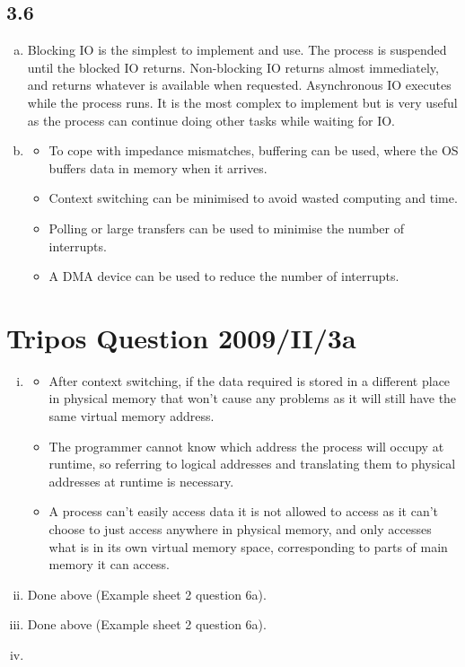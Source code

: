 \documentclass[12pt]{article}
\begin{document}
\subsection*{3.6}
\begin{enumerate}[(a)]
    \item Blocking IO is the simplest to implement and use. The process is suspended until the blocked IO returns. Non-blocking IO returns almost immediately, and returns whatever is available when requested. Asynchronous IO executes while the process runs. It is the most complex to implement but is very useful as the process can continue doing other tasks while waiting for IO.
    \item \begin{itemize}
        \item To cope with impedance mismatches, buffering can be used, where the OS buffers data in memory when it arrives.
        \item Context switching can be minimised to avoid wasted computing and time.
        \item Polling or large transfers can be used to minimise the number of interrupts.
        \item A DMA device can be used to reduce the number of interrupts.
    \end{itemize}
\end{enumerate}

\section*{Tripos Question 2009/II/3a}

\begin{enumerate}[(i)]
    \item \begin{itemize}
        \item After context switching, if the data required is stored in a different place in physical memory that won't cause any problems as it will still have the same virtual memory address.
        \item The programmer cannot know which address the process will occupy at runtime, so referring to logical addresses and translating them to physical addresses at runtime is necessary.
        \item A process can't easily access data it is not allowed to access as it can't choose to just access anywhere in physical memory, and only accesses what is in its own virtual memory space, corresponding to parts of main memory it can access.
    \end{itemize}
    \item Done above (Example sheet 2 question 6a).
    \item Done above (Example sheet 2 question 6a).
    \item 
\end{enumerate}
\end{document}
